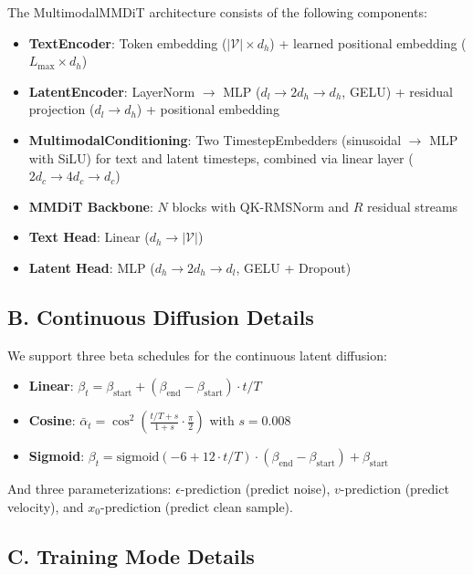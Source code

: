 \documentclass{article}
\begin{document}
The MultimodalMMDiT architecture consists of the following components:

\begin{itemize}
    \item \textbf{TextEncoder}: Token embedding ($|\mathcal{V}| \times d_h$) + learned positional embedding ($L_{\max} \times d_h$)
    \item \textbf{LatentEncoder}: LayerNorm $\rightarrow$ MLP ($d_l \rightarrow 2d_h \rightarrow d_h$, GELU) + residual projection ($d_l \rightarrow d_h$) + positional embedding
    \item \textbf{MultimodalConditioning}: Two TimestepEmbedders (sinusoidal $\rightarrow$ MLP with SiLU) for text and latent timesteps, combined via linear layer ($2d_c \rightarrow 4d_c \rightarrow d_c$)
    \item \textbf{MMDiT Backbone}: $N$ blocks with QK-RMSNorm and $R$ residual streams
    \item \textbf{Text Head}: Linear ($d_h \rightarrow |\mathcal{V}|$)
    \item \textbf{Latent Head}: MLP ($d_h \rightarrow 2d_h \rightarrow d_l$, GELU + Dropout)
\end{itemize}

\subsection*{B. Continuous Diffusion Details}

We support three beta schedules for the continuous latent diffusion:
\begin{itemize}
    \item \textbf{Linear}: $\beta_t = \beta_{\text{start}} + (\beta_{\text{end}} - \beta_{\text{start}}) \cdot t / T$
    \item \textbf{Cosine}: $\bar{\alpha}_t = \cos^2(\frac{t/T + s}{1+s} \cdot \frac{\pi}{2})$ with $s = 0.008$
    \item \textbf{Sigmoid}: $\beta_t = \text{sigmoid}(-6 + 12 \cdot t/T) \cdot (\beta_{\text{end}} - \beta_{\text{start}}) + \beta_{\text{start}}$
\end{itemize}

And three parameterizations: $\epsilon$-prediction (predict noise), $v$-prediction (predict velocity), and $x_0$-prediction (predict clean sample).

\subsection*{C. Training Mode Details}
\end{document}
